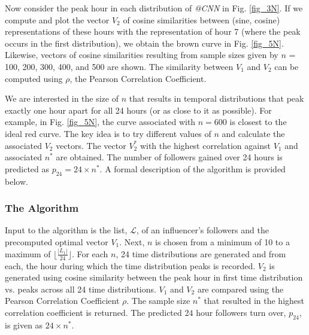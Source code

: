 Now consider the peak hour in each distribution of \emph{@CNN} in Fig. \ref{fig_3N}. If we compute and plot the vector $V_2$ of cosine similarities between (sine, cosine) representations of these hours with the representation of hour 7 (where the peak occurs in the first distribution), we obtain the brown curve in Fig. \ref{fig_5N}. Likewise, vectors of cosine similarities resulting from sample sizes given by $n$ = 100, 200, 300, 400, and 500 are shown. The similarity between $V_1$ and $V_2$ can be computed using $\rho$, the Pearson Correlation Coefficient. 

We are interested in the size of $n$ that results in temporal distributions that peak exactly one hour apart for all 24 hours (or as close to it as possible). For example, in Fig. \ref{fig_5N}, the curve associated with $n=600$ is closest to the ideal red curve. The key idea is to try different values of $n$ and calculate the associated $V_2$ vectors. The vector $V^*_2$ with the highest correlation against $V_1$ and associated  $n^*$ are obtained. The number of followers gained over 24 hours is predicted as $p_{24} = 24 \times n^*$. A formal description of the algorithm is provided below.
 


\subsubsection{The Algorithm} \label{algo-gain} Input to the algorithm is the list, $\mathcal{L}$, of an influencer's followers  and the precomputed optimal vector $V_1$.  Next,  $n$ is chosen from a minimum of 10 to a maximum of $\lfloor\frac{|L_1|}{24}\rfloor$. For each $n$, 24 time distributions are generated and from each, the hour during which the time distribution peaks is recorded. $V_2$ is generated using cosine similarity between the %
peak hour in first time distribution vs. peaks across all 24 time distributions.
$V_1$ and $V_2$ are compared using the Pearson Correlation Coefficient $\rho$. The sample size $n^*$ that resulted in the highest correlation coefficient is returned. The predicted 24 hour followers turn over, $p_{24}$, is given as $ 24 \times n^*$.

